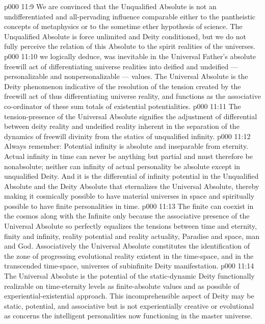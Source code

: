 \vs p000 11:9 We are convinced that the Unqualified Absolute is not an undifferentiated and all\hyp{}pervading influence comparable either to the pantheistic concepts of metaphysics or to the sometime ether hypothesis of science. The Unqualified Absolute is force unlimited and Deity conditioned, but we do not fully perceive the relation of this Absolute to the spirit realities of the universes.
\vs p000 11:10 \bibnobreakspace {} we logically deduce, was inevitable in the Universal Father’s absolute freewill act of differentiating universe realities into deified and undeified --- personalizable and nonpersonalizable --- values. The Universal Absolute is the Deity phenomenon indicative of the resolution of the tension created by the freewill act of thus differentiating universe reality, and functions as the associative co\hyp{}ordinator of these sum totals of existential potentialities.
\vs p000 11:11 \pc The tension\hyp{}presence of the Universal Absolute signifies the adjustment of differential between deity reality and undeified reality inherent in the separation of the dynamics of freewill divinity from the statics of unqualified infinity.
\vs p000 11:12 \pc Always remember: Potential infinity is absolute and inseparable from eternity. Actual infinity in time can never be anything but partial and must therefore be nonabsolute; neither can infinity of actual personality be absolute except in unqualified Deity. And it is the differential of infinity potential in the Unqualified Absolute and the Deity Absolute that eternalizes the Universal Absolute, thereby making it cosmically possible to have material universes in space and spiritually possible to have finite personalities in time.
\vs p000 11:13 The finite can coexist in the cosmos along with the Infinite only because the associative presence of the Universal Absolute so perfectly equalizes the tensions between time and eternity, finity and infinity, reality potential and reality actuality, Paradise and space, man and God. Associatively the Universal Absolute constitutes the identification of the zone of progressing evolutional reality existent in the time\hyp{}space, and in the transcended time\hyp{}space, universes of subinfinite Deity manifestation.
\vs p000 11:14 The Universal Absolute is the potential of the static\hyp{}dynamic Deity functionally realizable on time\hyp{}eternity levels as finite\hyp{}absolute values and as possible of experiential\hyp{}existential approach. This incomprehensible aspect of Deity may be static, potential, and associative but is not experientially creative or evolutional as concerns the intelligent personalities now functioning in the master universe.
